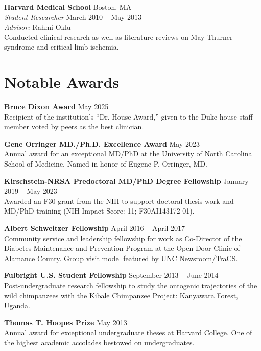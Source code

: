 \documentclass[11pt,letterpaper]{article}
\newcommand{\entry}[4]{%
  \textbf{#1} \hfill #2 \\
  \textit{#3} \hfill #4 \\[2pt]
}
\newcommand{\simpleentry}[2]{%
  \textbf{#1} \hfill #2 \\[2pt]
}
\begin{document}
\vspace{12pt}

\entry{Harvard Medical School}{Boston, MA}{Student Researcher}{March 2010 -- May 2013}
\textit{Advisor:} Rahmi Oklu \\[2pt]
Conducted clinical research as well as literature reviews on May-Thurner syndrome and critical limb ischemia.

\vspace{18pt}

\section{Notable Awards}

\simpleentry{Bruce Dixon Award}{May 2025}
Recipient of the institution's ``Dr. House Award,'' given to the Duke house staff member voted by peers as the best clinician.

\vspace{8pt}

\simpleentry{Gene Orringer MD./Ph.D. Excellence Award}{May 2023}
Annual award for an exceptional MD/PhD at the University of North Carolina School of Medicine. Named in honor of Eugene P. Orringer, MD.

\vspace{8pt}

\simpleentry{Kirschstein-NRSA Predoctoral MD/PhD Degree Fellowship}{January 2019 -- May 2023}
Awarded an F30 grant from the NIH to support doctoral thesis work and MD/PhD training (NIH Impact Score: 11; F30AI143172-01).

\vspace{8pt}

\simpleentry{Albert Schweitzer Fellowship}{April 2016 -- April 2017}
Community service and leadership fellowship for work as Co-Director of the Diabetes Maintenance and Prevention Program at the Open Door Clinic of Alamance County. Group visit model featured by UNC Newsroom/TraCS.

\vspace{8pt}

\simpleentry{Fulbright U.S. Student Fellowship}{September 2013 -- June 2014}
Post-undergraduate research fellowship to study the ontogenic trajectories of the wild chimpanzees with the Kibale Chimpanzee Project: Kanyawara Forest, Uganda.

\vspace{8pt}

\simpleentry{Thomas T. Hoopes Prize}{May 2013}
Annual award for exceptional undergraduate theses at Harvard College. One of the highest academic accolades bestowed on undergraduates.
\end{document}
